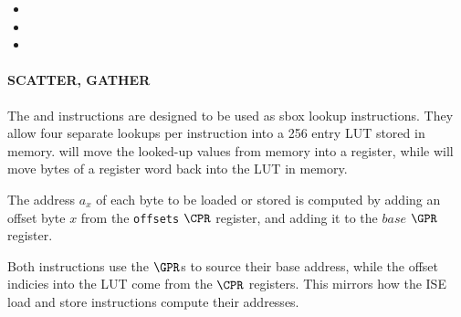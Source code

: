 \begin{itemize}
\item {}
\item {}
\item {}
\end{itemize}


\paragraph{SCATTER, GATHER}

The  and  instructions are designed to be used as
sbox lookup instructions. They allow four separate lookups per instruction
into a 256 entry LUT stored in memory.  will move the looked-up
values from memory into a register, while  will move bytes of a
register word back into the LUT in memory.

The address $a_x$ of each byte to be loaded or stored is computed by
adding an offset byte $x$ from the {\tt offsets} $\CPR$ register, and
adding it to the $base$ $\GPR$ register.

Both instructions use the $\GPR$s to source their base address, while the
offset indicies into the LUT come from the $\CPR$ registers. This mirrors
how the ISE load and store instructions compute their addresses.

